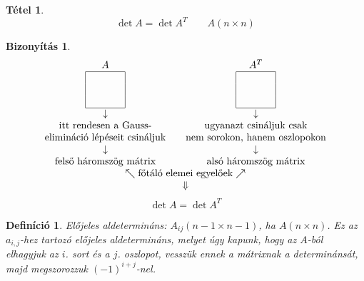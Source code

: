 \documentclass[a4paper,12pt,twoside]{book}
\newtheorem{defi}{Definíció}[chapter]
\newtheorem{tetel}{Tétel}[chapter]
\newtheorem{biz}{Bizonyítás}[chapter]
\theoremstyle{break}
\begin{document}
\begin{tetel}
 \[\boxed{\det A = \det A^T} \qquad A(n\times n)\]
\end{tetel}
\begin{biz}
 \[\begin{matrix}
  A & & A^T\\
  \begin{array}{|cccc|}
   \hline
    &  &  &  \\
    &  &  &  \\
    &  &  &  \\
   \hline
  \end{array} & & \begin{array}{|cccc|}
   \hline
    &  &  &  \\
    &  &  &  \\
    &  &  &  \\
   \hline
  \end{array}\\
  \downarrow & & \downarrow\\
  \hbox{itt rendesen a Gauss-} & & \hbox{ugyanazt csináljuk csak}\\
  \hbox{elimináció lépéseit csináljuk} & & \hbox{nem sorokon, hanem oszlopokon}\\
  \downarrow & & \downarrow\\
  \hbox{felső háromszög mátrix} & & \hbox{alsó háromszög mátrix}\\
  \multicolumn{3}{c}{\nwarrow\hbox{főtáló elemei egyelőek}\nearrow}\\
  \multicolumn{3}{c}{\Downarrow}\\
 \end{matrix}\]
\[\det A = \det A^T\]
\end{biz}

\begin{defi}
 \emph{Előjeles aldetermináns}: $A_{ij}(n-1\times n-1)$, ha $A(n\times n)$. Ez az $a_{i,j}$-hez tartozó előjeles aldetermináns, melyet úgy kapunk, hogy az $A$-ból elhagyjuk az $i$. sort és a $j$. oszlopot, vesszük ennek a mátrixnak a determinánsát, majd megszorozzuk $(-1)^{i+j}$-nel.
\end{defi}
\end{document}
